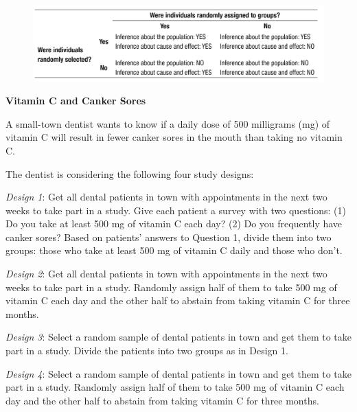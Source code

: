 \documentclass[a4paper, 12pt,twoside]{book}
\begin{document}
\begin{enumerate}[(1)]
 \begin{figure}[H]
   \hspace{-2.5cm}
   \includegraphics[scale=0.6]{ScopeOfInference}
   \label{ScopeOfInference}
 \end{figure}
 
 \end{enumerate}
 \newpage
 
 

   \colorbox{champagne}{\parbox{\textwidth}{
   \textbf{Vitamin C and Canker Sores}
   \vspace{3pt}
   
   A small-town dentist wants to know if a daily dose of 500 milligrams (mg) of vitamin C will result in fewer canker sores in the mouth than taking no vitamin C.
   \vspace{0.3cm}
   
   The dentist is considering the following four study designs:
   \vspace{0.3cm}
   
   \textit{Design 1}: Get all dental patients in town with appointments in the next two weeks to take part in a study. Give each patient a survey with two questions: (1) Do you take at least 500 mg of vitamin C each day? (2) Do you frequently have canker sores? Based on patients’ answers to Question 1, divide them into two groups: those who take at least 500 mg of vitamin C daily and those who don’t.
   \vspace{0.3cm}
   
   \textit{Design 2}: Get all dental patients in town with appointments in the next two weeks to take part in a study. Randomly assign half of them to take 500 mg of vitamin C each day and the other half to abstain from taking vitamin C for three months.
   \vspace{0.3cm}
   
   \textit{Design 3}: Select a random sample of dental patients in town and get them to take part in a study. Divide the patients into two groups as in Design 1.
   \vspace{0.3cm}
   
   \textit{Design 4}: Select a random sample of dental patients in town and get them to take part in a study. Randomly assign half of them to take 500 mg of vitamin C each day and the other half to abstain from taking vitamin C for three months.
   \vspace{0.3cm}
   
}}
\end{document}
